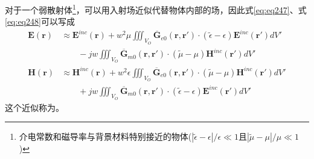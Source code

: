 \documentclass{article}
\numberwithin{equation}{section}
\renewcommand{\vec}[1]{\boldsymbol{#1}}
\begin{document}
对于一个弱散射体\footnote{介电常数和磁导率与背景材料特别接近的物体($|\tilde{\epsilon}-\epsilon|/\epsilon\ll 1$且$|\tilde{\mu}-\mu|/\mu\ll 1$)}，可以用入射场近似代替物体内部的场，因此式\ref{eq:eq247}、式\ref{eq:eq248}可以写成
\begin{align}
    \label{eq:eq249}
    \mathbf{E}(\vec{r})&\approx\mathbf{E}^{inc}(\vec{r})+w^2\mu\iiint_{V_O}\overline{\mathbf{G}}_{e0}(\vec{r},\vec{r}')\cdot(\tilde{\epsilon}-\epsilon)\mathbf{E}^{inc}(\vec{r}')dV' \nonumber \\
                       &\qquad-jw\iiint_{V_O}\overline{\mathbf{G}}_{m0}(\vec{r},\vec{r}')\cdot (\tilde{\mu}-\mu)\mathbf{H}^{inc}(\vec{r}')dV'  \\
    \label{eq:eq250}
    \mathbf{H}(\vec{r})&\approx\mathbf{H}^{inc}(\vec{r})+w^2\epsilon\iiint_{V_O}\overline{\mathbf{G}}_{e0}(\vec{r},\vec{r}')\cdot(\tilde{\mu}-\mu)\mathbf{H}^{inc}(\vec{r}')dV' \nonumber \\
                       &\qquad+jw\iiint_{V_O}\overline{\mathbf{G}}_{m0}(\vec{r},\vec{r}')\cdot (\tilde{\epsilon}-\epsilon)\mathbf{E}^{inc}(\vec{r}')dV'
\end{align}
这个近似称为\textbf{\color{blue}{一阶博恩近似}}。\par
\end{document}
